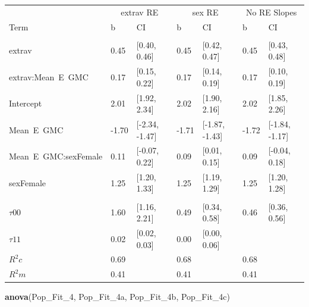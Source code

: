 \documentclass[]{article}
\newenvironment{Shaded}{\begin{snugshade}}{\end{snugshade}}
\newcommand{\KeywordTok}[1]{\textcolor[rgb]{0.13,0.29,0.53}{\textbf{#1}}}
\newcommand{\DecValTok}[1]{\textcolor[rgb]{0.00,0.00,0.81}{#1}}
\newcommand{\NormalTok}[1]{#1}
\begin{document}
\begin{tabular}{lllllll}
\toprule
\multicolumn{1}{c}{ } & \multicolumn{2}{c}{extrav RE} & \multicolumn{2}{c}{sex RE} & \multicolumn{2}{c}{No RE Slopes} \\
\cmidrule(l{2pt}r{2pt}){2-3} \cmidrule(l{2pt}r{2pt}){4-5} \cmidrule(l{2pt}r{2pt}){6-7}
Term & b & CI & b & CI & b & CI\\
\midrule
\addlinespace[0.3em]
\multicolumn{7}{l}{\textbf{Fixed}}\\
\hspace{1em}extrav & 0.45 & [0.40, 0.46] & 0.45 & [0.42, 0.47] & 0.45 & [0.43, 0.48]\\
\hspace{1em}extrav:Mean\ E\ GMC & 0.17 & [0.15, 0.22] & 0.17 & [0.14, 0.19] & 0.17 & [0.10, 0.19]\\
\hspace{1em}Intercept & 2.01 & [1.92, 2.34] & 2.02 & [1.90, 2.16] & 2.02 & [1.85, 2.26]\\
\hspace{1em}Mean\ E\ GMC & -1.70 & [-2.34, -1.47] & -1.71 & [-1.87, -1.43] & -1.72 & [-1.84, -1.17]\\
\hspace{1em}Mean\ E\ GMC:sexFemale & 0.11 & [-0.07, 0.22] & 0.09 & [0.01, 0.15] & 0.09 & [-0.04, 0.18]\\
\hspace{1em}sexFemale & 1.25 & [1.20, 1.33] & 1.25 & [1.19, 1.29] & 1.25 & [1.20, 1.28]\\
\addlinespace[0.3em]
\multicolumn{7}{l}{\textbf{Random}}\\
\hspace{1em}$\tau {00}$ & 1.60 & [1.16, 2.21] & 0.49 & [0.34, 0.58] & 0.46 & [0.36, 0.56]\\
\hspace{1em}$\tau {11}$ & 0.02 & [0.02, 0.03] & 0.00 & [0.00, 0.06] &  & \\
$R^2 c$ & 0.69 &  & 0.68 &  & 0.68 & \\
$R^2 m$ & 0.41 &  & 0.41 &  & 0.41 & \\
\bottomrule
\end{tabular}

\begin{Shaded}
\begin{Highlighting}[]
\KeywordTok{anova}\NormalTok{(Pop_Fit_}\DecValTok{4}\NormalTok{, Pop_Fit_4a, Pop_Fit_4b, Pop_Fit_4c)}
\end{Highlighting}
\end{Shaded}
\end{document}
